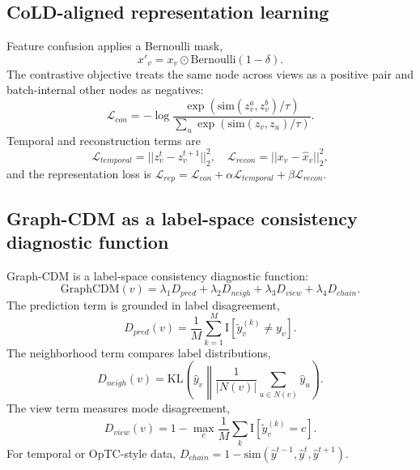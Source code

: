 \documentclass[preprint,12pt]{elsarticle}
\newcommand{\gcdm}{\mathrm{GraphCDM}}
\newcommand{\ypred}{\hat{y}}
\newcommand{\ynoise}{\tilde{y}}
\begin{document}
\subsection{CoLD-aligned representation learning}
Feature confusion applies a Bernoulli mask,
\begin{equation}
x'_v=x_v\odot \mathrm{Bernoulli}(1-\delta).
\end{equation}
The contrastive objective treats the same node across views as a positive pair and batch-internal other nodes as negatives:
\begin{equation}
\mathcal{L}_{con}=-\log\frac{\exp(\mathrm{sim}(z_v^a,z_v^b)/\tau)}{\sum_u\exp(\mathrm{sim}(z_v,z_u)/\tau)}.
\end{equation}
Temporal and reconstruction terms are
\begin{equation}
\mathcal{L}_{temporal}=||z_v^t-z_v^{t+1}||_2^2,\quad
\mathcal{L}_{recon}=||x_v-\hat{x}_v||_2^2,
\end{equation}
and the representation loss is $\mathcal{L}_{rep}=\mathcal{L}_{con}+\alpha\mathcal{L}_{temporal}+\beta\mathcal{L}_{recon}$.

\subsection{Graph-CDM as a label-space consistency diagnostic function}
Graph-CDM is a label-space consistency diagnostic function:
\begin{equation}
\gcdm(v)=\lambda_1D_{pred}+\lambda_2D_{neigh}+\lambda_3D_{view}+\lambda_4D_{chain}.
\end{equation}
The prediction term is grounded in label disagreement,
\begin{equation}
D_{pred}(v)=\frac{1}{M}\sum_{k=1}^{M}\mathrm{I}[\ynoise_v^{(k)}\neq y_v].
\end{equation}
The neighborhood term compares label distributions,
\begin{equation}
D_{neigh}(v)=\mathrm{KL}\left(\ypred_v\middle\|\frac{1}{|N(v)|}\sum_{u\in N(v)}\ypred_u\right).
\end{equation}
The view term measures mode disagreement,
\begin{equation}
D_{view}(v)=1-\max_c\frac{1}{M}\sum_k\mathrm{I}[\ynoise_v^{(k)}=c].
\end{equation}
For temporal or OpTC-style data, $D_{chain}=1-\mathrm{sim}(\ypred^{t-1},\ypred^t,\ypred^{t+1})$.
\end{document}
